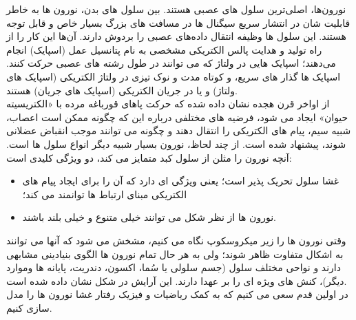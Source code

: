 \documentclass[a4paper,12pt]{article}
\begin{document}
نورون‌ها، اصلی‌ترین سلول های عصبی هستند. بین سلول های بدن، نورون ها به خاطر قابلیت شان در انتشار سریع سیگنال ها در مسافت های بزرگ بسیار خاص و قابل توجه هستند. این سلول ها وظیفه انتقال داده‌های عصبی را بردوش دارند.
 آن‌ها این کار را از راه تولید و هدایت پالس الکتریکی مشخصی به نام پتانسیل عمل (اسپایک) انجام می‌دهند؛ اسپایک هایی در ولتاژ که می توانند در طول رشته های عصبی حرکت کنند. اسپایک ها گذار های سریع، و کوتاه مدت و نوک تیزی در ولتاژ الکتریکی (اسپایک های ولتاژ) و یا در جریان الکتریکی (اسپایک های جریان) هستند.
 \\

از اواخر قرن هجده نشان داده شده که حرکت پاهای قورباغه مرده با «الکتریسیته حیوان» ایجاد می شود، فرضیه های مختلفی درباره این که چگونه ممکن است اعصاب، شبیه سیم، پیام های الکتریکی را انتقال دهند و چگونه می توانند موجب انقباض عضلانی شوند، پیشنهاد شده است. از چند لحاظ، نورون بسیار شبیه دیگر انواع سلول ها است. آنچه نورون را مثلن از سلول کبد متمایز می کند، دو ویژگی کلیدی است:
\begin{itemize}
	\item{
غشا سلول تحریک پذیر است؛ یعنی ویژگی ای دارد که آن را برای ایجاد پیام های الکتریکی مبنای ارتباط ها توانمند می کند؛
	}
	\item {
نورون ها از نظر شکل می توانند خیلی متنوع و خیلی بلند باشند. 
	}
\end{itemize}
وقتی نورون ها را زیر میکروسکوپ نگاه می کنیم، مشخش می شود که آنها می توانند به اشکال متفاوت ظاهر شوند؛ ولی به هر حال تمام نورون ها الگوی بنیادینی مشابهی دارند و نواحی مختلف سلول (جسم سلولی یا سُما، اکسون، دندریت، پایانه ها وموارد دیگر)، کنش های ویژه ای را بر عهدا دارند. این آرایش در شکل نشان داده شده است.
\\
در اولین قدم سعی می کنیم که به کمک ریاضیات و فیزیک رفتار غشا نورون ها را مدل سازی کنیم.
\end{document}
